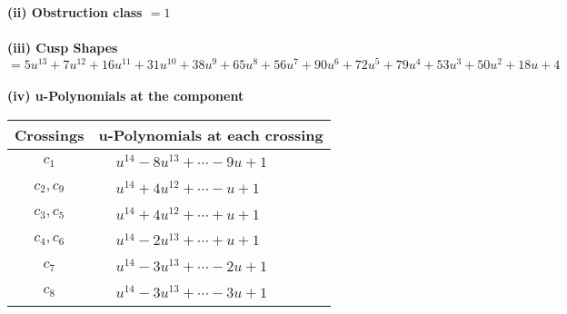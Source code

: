 \documentclass[1p]{elsarticle_modified}
\theoremstyle{definition}
\begin{document}
\flushleft \textbf{(ii) Obstruction class $= 1$}\\~\\
\flushleft \textbf{(iii) Cusp Shapes $= 5 u^{13}+7 u^{12}+16 u^{11}+31 u^{10}+38 u^9+65 u^8+56 u^7+90 u^6+72 u^5+79 u^4+53 u^3+50 u^2+18 u+4$}\\~\\
\newpage\renewcommand{\arraystretch}{1}
\flushleft \textbf{(iv) u-Polynomials at the component}\newline \\
\begin{tabular}{m{50pt}|m{274pt}}
Crossings & \hspace{64pt}u-Polynomials at each crossing \\
\hline $$\begin{aligned}c_{1}\end{aligned}$$&$\begin{aligned}
&u^{14}-8 u^{13}+\cdots-9 u+1
\end{aligned}$\\
\hline $$\begin{aligned}c_{2},c_{9}\end{aligned}$$&$\begin{aligned}
&u^{14}+4 u^{12}+\cdots- u+1
\end{aligned}$\\
\hline $$\begin{aligned}c_{3},c_{5}\end{aligned}$$&$\begin{aligned}
&u^{14}+4 u^{12}+\cdots+u+1
\end{aligned}$\\
\hline $$\begin{aligned}c_{4},c_{6}\end{aligned}$$&$\begin{aligned}
&u^{14}-2 u^{13}+\cdots+u+1
\end{aligned}$\\
\hline $$\begin{aligned}c_{7}\end{aligned}$$&$\begin{aligned}
&u^{14}-3 u^{13}+\cdots-2 u+1
\end{aligned}$\\
\hline $$\begin{aligned}c_{8}\end{aligned}$$&$\begin{aligned}
&u^{14}-3 u^{13}+\cdots-3 u+1
\end{aligned}$\\

\end{tabular}
\end{document}
